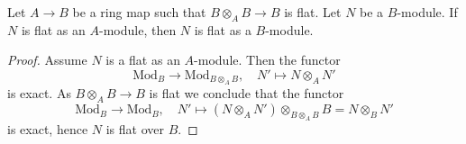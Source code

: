 \begin{lemma}
\label{lemma-key}
Let $A \to B$ be a ring map such that $B \otimes_A B \to B$ is flat.
Let $N$ be a $B$-module. If $N$ is flat as an $A$-module, then
$N$ is flat as a $B$-module.
\end{lemma}

\begin{proof}
Assume $N$ is a flat as an $A$-module.
Then the functor
$$
\text{Mod}_B \longrightarrow \text{Mod}_{B \otimes_A B},\quad
N' \mapsto N \otimes_A N'
$$
is exact. As $B \otimes_A B \to B$ is flat we conclude that the functor
$$
\text{Mod}_B \longrightarrow \text{Mod}_B,\quad
N' \mapsto (N \otimes_A N') \otimes_{B \otimes_A B} B = N \otimes_B N'
$$
is exact, hence $N$ is flat over $B$.
\end{proof}
